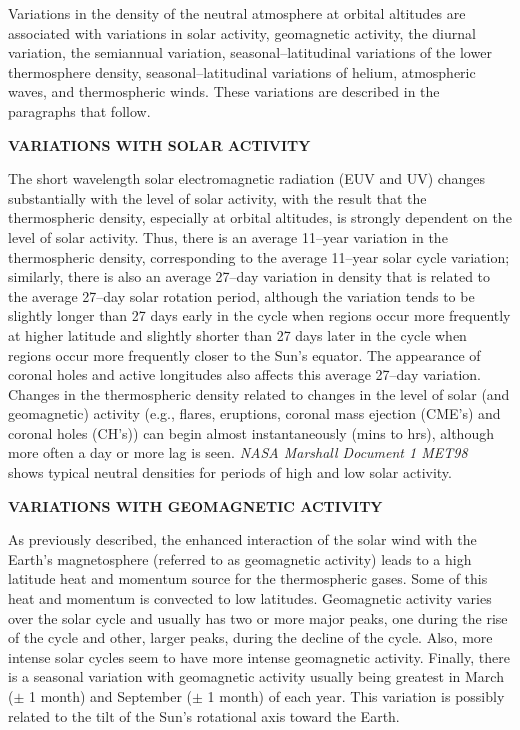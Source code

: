 Variations in the density of the neutral atmosphere at orbital altitudes are
associated with variations in solar activity, geomagnetic activity, the
diurnal variation, the semiannual variation, seasonal--latitudinal
variations of the lower thermosphere density, seasonal--latitudinal
variations of helium, atmospheric waves, and thermospheric winds.  These
variations are described in the paragraphs that follow.

\textbf{VARIATIONS WITH SOLAR ACTIVITY}

The short wavelength solar electromagnetic radiation (EUV and UV) changes
substantially with the level of solar activity, with the result that the
thermospheric density, especially at orbital altitudes, is strongly
dependent on the level of solar activity.  Thus, there is an average 11--year
variation in the thermospheric density, corresponding to the average
11--year solar cycle variation; similarly, there is also an average 27--day
variation in density that is related to the average 27--day solar rotation
period, although the variation tends to be slightly longer than 27 days
early in the cycle when regions occur more frequently at higher latitude and
slightly shorter than 27 days later in the cycle when regions occur more
frequently closer to the Sun's equator.  The appearance of coronal holes and
active longitudes also affects this average 27--day variation.  Changes in
the thermospheric density related to changes in the level of solar (and
geomagnetic) activity (e.g., flares, eruptions, coronal mass ejection
(CME's) and coronal holes (CH's)) can begin almost instantaneously (mins to
hrs), although more often a day or more lag is seen.
{\em NASA Marshall Document 1 MET98}~\cite{Hickey} shows
typical neutral densities for periods of high and low solar activity.

\textbf{VARIATIONS WITH GEOMAGNETIC ACTIVITY}

As previously described, the enhanced interaction of the solar wind with the
Earth's magnetosphere (referred to as geomagnetic activity) leads to a high
latitude heat and momentum source for the thermospheric gases.  Some of this
heat and momentum is convected to low latitudes.  Geomagnetic activity varies
over the solar cycle and usually has two or more major peaks, one during the
rise of the cycle and other, larger peaks, during the decline of the cycle.
Also, more intense solar cycles seem to have more intense geomagnetic
activity. Finally, there is a seasonal variation with geomagnetic activity
usually being greatest in March ($\pm $ 1 month) and September ($\pm $ 1
month) of each year.  This variation is possibly related to the tilt of the
Sun's rotational axis toward the Earth.

